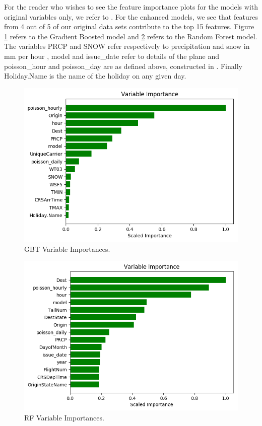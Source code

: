 \documentclass[twocolumn,showpacs,%
  nofootinbib,aps,superscriptaddress,%
  eqsecnum,prd,notitlepage,showkeys,10pt]{revtex4-1}
\begin{document}
For the reader who wishes to see the feature importance plots for the models with original variables only, we refer to \cite{airline4}. For the enhanced models, we see that features from 4 out of 5 of our original
data sets contribute to the top 15 features. Figure \ref{fig:GB} refers to the Gradient Boosted model and \ref{fig:RF} refers to the Random Forest model. The variables PRCP and SNOW refer respectively to precipitation and snow in mm per hour \cite{weather_readme}, model and issue\_date refer to details of the plane \cite{aviation} and
poisson\_hour and poisson\_day are as defined above, constructed in \cite{airline2}. Finally Holiday.Name is the name of the holiday on any given day. 
\begin{figure}
\includegraphics[scale=0.5]{gb_variables}
\caption{\label{fig:GB}GBT Variable Importances.}
\end{figure}

\begin{figure}
\includegraphics[scale=0.5]{rf_variables}
\caption{\label{fig:RF}RF Variable Importances.}
\end{figure}
\end{document}

